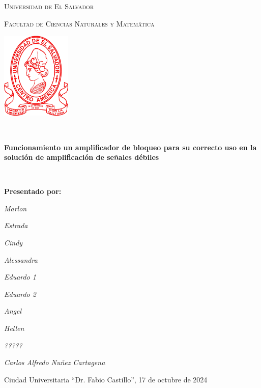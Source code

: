 \hypersetup{
    colorlinks=true,
    linkcolor=black,
    citecolor=blue,
    urlcolor=blue
}

\begin{titlepage}
\centering

{\scshape\LARGE Universidad de El Salvador \par}
{\scshape\Large Facultad de Ciencias Naturales y Matemática \par}
\vspace{0.5cm}
\centering
{\includegraphics[width=0.25\textwidth]{Chapters/1_Portada/Cover_Figures/UniversidaddeElSalvador_Logo.png}\par}
\hrulefill \\
{\bfseries\LARGE{Funcionamiento un amplificador de bloqueo para su correcto uso en la solución de amplificación de señales débiles}
\par}
\hrulefill \\
\vspace{0.5cm}
{\bfseries\Large{Presentado por:} \par}
{\Large {\itshape Marlon} \par}
{\Large {\itshape Estrada} \par}
{\Large {\itshape Cindy} \par}
{\Large {\itshape Alessandra} \par}
{\Large {\itshape Eduardo 1} \par}
{\Large {\itshape Eduardo 2} \par}
{\Large {\itshape Angel} \par}
{\Large {\itshape Hellen} \par}
{\Large {\itshape ?????} \par}
{\Large {\itshape Carlos Alfredo Nuñez Cartagena} \par}
\vfill
{\Large {Ciudad Universitaria “Dr. Fabio Castillo”, 17 de octubre de 2024} \par}
\end{titlepage}